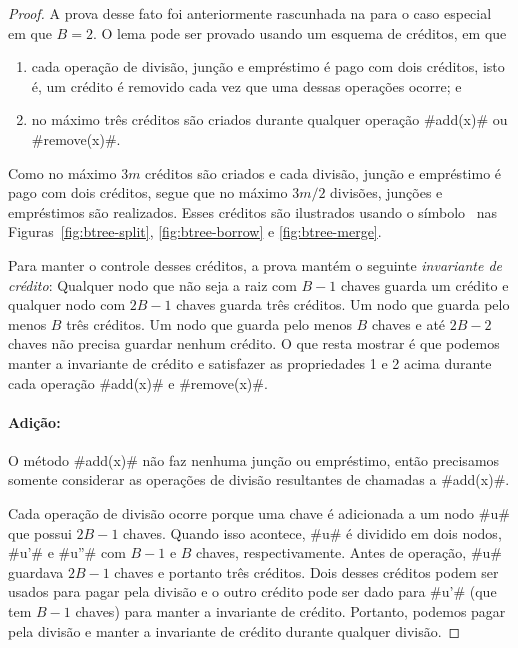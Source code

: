 \begin{proof}
  A prova desse fato foi anteriormente rascunhada na
    para o caso especial em que $B=2$.
   O lema pode ser provado usando um esquema de créditos,
   em que
  \begin{enumerate}
    \item cada operação de divisão, junção e empréstimo é pago com dois créditos, isto é, um crédito é removido cada vez que uma dessas operações ocorre; e 
    \item no máximo três créditos são criados durante qualquer operação #add(x)# ou
      #remove(x)#.
  \end{enumerate}
  Como no máximo $3m$ créditos são criados e cada divisão, junção e
  empréstimo é pago com dois créditos, segue que no máximo
  $3m/2$ divisões, junções e empréstimos são realizados. 
  Esses créditos são ilustrados usando o símbolo
 \cent\ nas
  Figuras~\ref{fig:btree-split}, \ref{fig:btree-borrow} e
  \ref{fig:btree-merge}.

  Para manter o controle desses créditos, a prova mantém
  o seguinte \emph{invariante de crédito}:
  Qualquer nodo que não seja a raiz com $B-1$ chaves guarda um crédito 
  e qualquer nodo com 
  $2B-1$ chaves guarda três créditos. Um nodo que guarda pelo menos
  $B$ três créditos.
  Um nodo que guarda pelo menos $B$ chaves e até 
$2B-2$ chaves não precisa guardar nenhum crédito.
  O que resta mostrar é que podemos manter a invariante de crédito 
  e satisfazer as propriedades 1 e 2 acima durante cada operação #add(x)# e #remove(x)#.

  \paragraph{Adição:}
  O método #add(x)# não faz nenhuma junção ou empréstimo, então
  precisamos somente considerar as operações de divisão resultantes de chamadas a #add(x)#.

  Cada operação de divisão ocorre porque uma chave é adicionada a um nodo #u#
  que possui $2B-1$ chaves. Quando isso acontece, #u# é dividido em dois 
  nodos, #u'# e #u''# com $B-1$ e $B$ chaves, respectivamente.  Antes de operação, #u# guardava
  $2B-1$ chaves e portanto três créditos. 
  Dois desses créditos podem ser usados para pagar pela divisão e o outro
  crédito pode ser dado para #u'# (que tem $B-1$ chaves) para manter a
  invariante de crédito. Portanto, podemos pagar pela divisão e manter
  a invariante de crédito durante qualquer divisão.


\end{proof}

